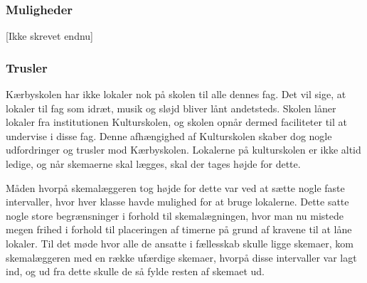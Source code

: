 \subsubsection*{Muligheder}
[Ikke skrevet endnu]

\subsubsection*{Trusler}
Kærbyskolen har ikke lokaler nok på skolen til alle dennes fag. Det vil sige, at lokaler til fag som idræt, musik og sløjd bliver lånt andetsteds. Skolen låner lokaler fra institutionen Kulturskolen, og skolen opnår dermed faciliteter til at undervise i disse fag. Denne afhængighed af Kulturskolen skaber dog nogle udfordringer og trusler mod Kærbyskolen. Lokalerne på kulturskolen er ikke altid ledige, og når skemaerne skal lægges, skal der tages højde for dette. 

Måden hvorpå skemalæggeren tog højde for dette var ved at sætte nogle faste intervaller, hvor hver klasse havde mulighed for at bruge lokalerne. Dette satte nogle store begrænsninger i forhold til skemalægningen, hvor man nu mistede megen frihed i forhold til placeringen af timerne på grund af kravene til at låne lokaler. Til det møde hvor alle de ansatte i fællesskab skulle ligge skemaer, kom skemalæggeren med en række ufærdige skemaer, hvorpå disse intervaller var lagt ind, og ud fra dette skulle de så fylde resten af skemaet ud. 